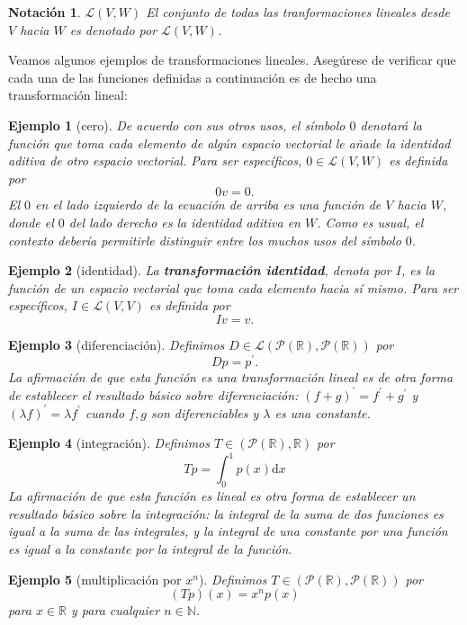 \documentclass[b5paper, 11pt]{book}
\newcommand{\0}{\mathbf{0}}
\theoremstyle{estiloB}
\newtheorem{ejemg}{Ejemplo}[chapter]
\theoremstyle{estiloC}
\theoremstyle{estiloD}
\newtheorem{notation}{Notación}[chapter]
\begin{document}
\begin{notation}{$\mathcal{L}\left(V,W\right)$}
El conjunto de todas las tranformaciones lineales desde $V$  hacia $W$ es denotado por $\mathcal{L}\left(V,W\right)$.
\end{notation}
Veamos algunos ejemplos de transformaciones lineales. Asegúrese de verificar que cada una de las funciones definidas a continuación es de hecho una transformación lineal:
\begin{ejemg}[cero]
De acuerdo con sus otros usos, el símbolo $0$ denotará la función que toma cada elemento de algún espacio vectorial le añade la identidad aditiva de otro espacio vectorial. Para ser específicos, $0\in\mathcal{L}\left(V,W\right)$ es definida por
\[
0v=0.
\]
El $0$ en el lado izquierdo de la ecuación de arriba es una función de $V$ hacia $W$, donde el $0$ del lado derecho es la identidad aditiva en $W$. Como es usual, el contexto debería permitirle distinguir entre los muchos usos del símbolo $0$.
\end{ejemg}
\begin{ejemg}[identidad]
La \textbf{\textit{transformación identidad}}, denota por $I$, es la función de un espacio vectorial que toma cada elemento hacia sí mismo. Para ser específicos, $I\in\mathcal{L}\left(V,V\right)$ es definida por
\[
Iv=v.
\]
\end{ejemg}
\begin{ejemg}[diferenciación]
Definimos $D\in\mathcal{L}\left(\mathcal{P}\left(\mathds{R}\right),\mathcal{P}\left(\mathds{R}\right)\right)$ por
\[
Dp=p^{\prime}.
\]
La afirmación de que esta función es una transformación lineal es de otra forma de establecer el resultado básico sobre diferenciación: ${\left(f+g\right)}^{\prime}=f^{\prime}+g^{\prime}$ y ${\left(\lambda f\right)}^{\prime}=\lambda f^{\prime}$ cuando $f, g$ son diferenciables y $\lambda$ es una constante.
\end{ejemg}
\begin{ejemg}[integración]
Definimos $T\in\left(\mathcal{P}\left(\mathds{R}\right),\mathds{R}\right)$ por
\[
Tp=\int_{0}^{1}p(x)\mathrm{d}x
\]
La afirmación de que esta función es lineal es otra forma de establecer un resultado básico sobre la integración: la integral de la suma de dos funciones es igual a la suma de las integrales, y la integral de una constante por una función es igual a la constante por la integral de la función.
\end{ejemg}
\begin{ejemg}[multiplicación por $x^{n}$]
Definimos $T\in\left(\mathcal{P}\left(\mathds{R}\right),\mathcal{P}\left(\mathds{R}\right)\right)$ por
\[
\left(Tp\right)\left(x\right)=x^{n}p(x)
\]
para $x\in\mathds{R}$ y para cualquier $n\in\mathds{N}$.
\end{ejemg}
\end{document}
